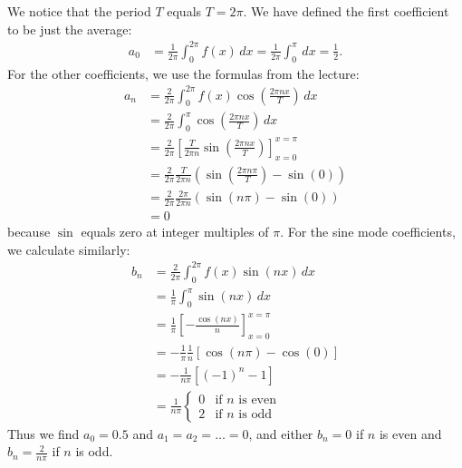 \documentclass[11pt]{article}
\begin{document}
\begin{solution}     
    We notice that the period $T$ equals $T = 2\pi$. 
    We have defined the first coefficient to be just the average:
    \begin{align*}
        a_0 
        &= 
        \frac{1}{2\pi} \int_0^{2\pi} f(x) \, dx 
        = 
        \frac{1}{2\pi} \int_0^\pi \, dx  = \frac 1 2
        .
    \end{align*}
    For the other coefficients, we use the formulas from the lecture:
    \begin{align*}
        a_n 
        &= 
        \frac{2}{2\pi} \int_0^{2\pi} f(x) \cos\left(\frac{2\pi n x}{T}\right) \, dx 
        \\&= 
        \frac{2}{2\pi} \int_0^\pi \cos\left(\frac{2\pi n x}{T}\right) \, dx 
        \\
        &= 
        \frac{2}{2\pi} \left[ \frac{T}{2\pi n} \sin\left(\frac{2\pi n x}{T}\right) \right]_{x=0}^{x=\pi}
        \\&= 
        \frac{2}{2\pi} \frac{T}{2\pi n} \left( \sin\left(\frac{2\pi n \pi}{T}\right) - \sin(0) \right) 
        \\&= 
        \frac{2}{2\pi} \frac{2\pi}{2\pi n} \left( \sin\left(n \pi \right) - \sin(0) \right) 
        \\&= 
        0
    \end{align*}
    because $\sin$ equals zero at integer multiples of $\pi$.
    For the sine mode coefficients, we calculate similarly:
    \begin{align*}
        b_n 
        &= 
        \frac{2}{2\pi}
        \int_0^{2\pi} f(x) \sin(nx) \, dx 
        \\
        &= 
        \frac{1}{\pi}
        \int_0^\pi \sin(nx) \, dx 
        \\
        &= 
        \frac{1}{\pi}
        \left[-\frac{\cos(nx)}{n} \right]_{x=0}^{x=\pi} 
        \\
        &= 
        -
        \frac{1}{\pi}
        \frac{1}{n} \left[ \cos(n\pi) - \cos(0) \right] 
        \\
        &= 
        -
        \frac{1}{n\pi}
        \left[ (-1)^n - 1 \right] 
        \\
        &= 
        \frac{1}{n\pi}
        \begin{cases}
            0 & \text{if } n \text{ is even} 
            \\
            2 & \text{if } n \text{ is odd}
        \end{cases}
    \end{align*}
    Thus we find $a_0 = 0.5$ and $a_1 = a_2 = \dots = 0$,
    and either $b_n = 0$ if $n$ is even and $b_n = \frac{2}{n\pi}$ if $n$ is odd. 
\end{solution}
\end{document}
